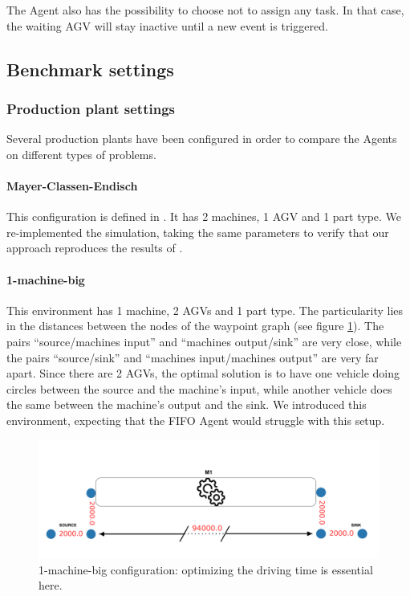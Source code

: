 \documentclass[sn-mathphys]{sn-jnl}
\begin{document}
The Agent also has the possibility to choose not to assign any task. In that case, the waiting AGV will stay inactive until a new event is triggered.

\subsection{Benchmark settings}

\subsubsection{Production plant settings}

Several production plants have been configured in order to compare the Agents on different types of problems.

\paragraph{Mayer-Classen-Endisch}

This configuration is defined in \cite{Mayer2021}. It has 2 machines, 1 AGV and 1 part type. We re-implemented the simulation, taking the same parameters to verify that our approach reproduces the results of \cite{Mayer2021}.

\paragraph{1-machine-big}

This environment has 1 machine, 2 AGVs and 1 part type. The particularity lies in the distances between the nodes of the waypoint graph (see figure \ref{fig:plan_1_machine_big}). The pairs “source/machines input” and “machines output/sink” are very close, while the pairs “source/sink” and “machines input/machines output” are very far apart. Since there are 2 AGVs, the optimal solution is to have one vehicle doing circles between the source and the machine's input, while another vehicle does the same between the machine's output and the sink. We introduced this environment, expecting that the FIFO Agent would struggle with this setup.

\begin{figure}[ht]
  \includegraphics[width=1.0\textwidth]{plan_1_machine_big.png}
  \caption{1-machine-big configuration: optimizing the driving time is essential here.}
  \label{fig:plan_1_machine_big}
\end{figure}
\end{document}
